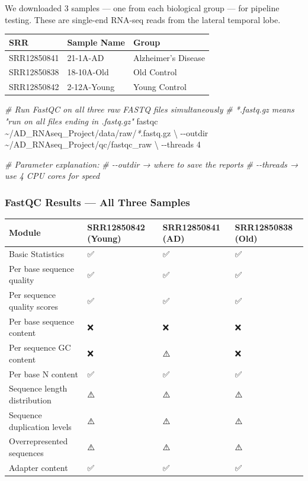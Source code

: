 \documentclass[
]{article}
\newenvironment{Shaded}{\begin{snugshade}}{\end{snugshade}}
\newcommand{\AttributeTok}[1]{\textcolor[rgb]{0.13,0.29,0.53}{#1}}
\newcommand{\CommentTok}[1]{\textcolor[rgb]{0.56,0.35,0.01}{\textit{#1}}}
\newcommand{\DataTypeTok}[1]{\textcolor[rgb]{0.13,0.29,0.53}{#1}}
\newcommand{\ExtensionTok}[1]{#1}
\newcommand{\NormalTok}[1]{#1}
\newcommand{\PreprocessorTok}[1]{\textcolor[rgb]{0.56,0.35,0.01}{\textit{#1}}}
\begin{document}
We downloaded 3 samples --- one from each biological group --- for
pipeline testing. These are single-end RNA-seq reads from the lateral
temporal lobe.

\begin{longtable}[]{@{}lll@{}}
\toprule\noalign{}
SRR & Sample Name & Group \\
\midrule\noalign{}
\endhead
\bottomrule\noalign{}
\endlastfoot
SRR12850841 & 21-1A-AD & Alzheimer's Disease \\
SRR12850838 & 18-10A-Old & Old Control \\
SRR12850842 & 2-12A-Young & Young Control \\
\end{longtable}

\begin{Shaded}
\begin{Highlighting}[]
\CommentTok{\# Run FastQC on all three raw FASTQ files simultaneously}
\CommentTok{\# *.fastq.gz means "run on all files ending in .fastq.gz"}
\ExtensionTok{fastqc}\NormalTok{ \textasciitilde{}/AD\_RNAseq\_Project/data/raw/}\PreprocessorTok{*}\NormalTok{.fastq.gz }\DataTypeTok{\textbackslash{}}
    \AttributeTok{{-}{-}outdir}\NormalTok{ \textasciitilde{}/AD\_RNAseq\_Project/qc/fastqc\_raw }\DataTypeTok{\textbackslash{}}
    \AttributeTok{{-}{-}threads}\NormalTok{ 4}

\CommentTok{\# Parameter explanation:}
\CommentTok{\# {-}{-}outdir  → where to save the reports}
\CommentTok{\# {-}{-}threads → use 4 CPU cores for speed}
\end{Highlighting}
\end{Shaded}

\subsubsection{FastQC Results --- All Three
Samples}\label{fastqc-results-all-three-samples}

\begin{longtable}[]{@{}llll@{}}
\toprule\noalign{}
Module & SRR12850842 (Young) & SRR12850841 (AD) & SRR12850838 (Old) \\
\midrule\noalign{}
\endhead
\bottomrule\noalign{}
\endlastfoot
Basic Statistics & ✅ & ✅ & ✅ \\
Per base sequence quality & ✅ & ✅ & ✅ \\
Per sequence quality scores & ✅ & ✅ & ✅ \\
Per base sequence content & ❌ & ❌ & ❌ \\
Per sequence GC content & ❌ & ⚠️ & ❌ \\
Per base N content & ✅ & ✅ & ✅ \\
Sequence length distribution & ⚠️ & ⚠️ & ⚠️ \\
Sequence duplication levels & ⚠️ & ⚠️ & ⚠️ \\
Overrepresented sequences & ⚠️ & ⚠️ & ⚠️ \\
Adapter content & ✅ & ✅ & ✅ \\
\end{longtable}
\end{document}
